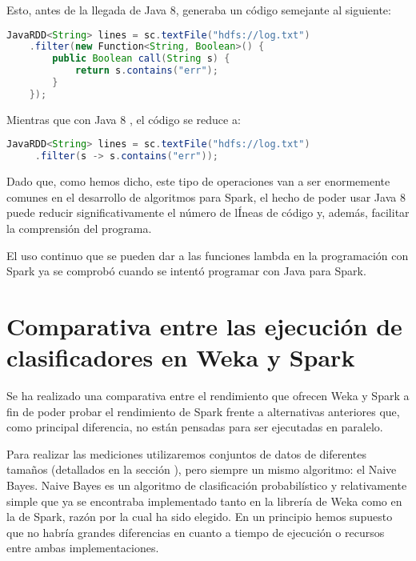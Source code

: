 Esto, antes de la llegada de Java 8, generaba un código semejante al siguiente:

\begin{lstlisting}[language=Java,tabsize=4,frame = single,caption=Código de función lambda en Java 7 \cite{Java7vs8}]
JavaRDD<String> lines = sc.textFile("hdfs://log.txt")
	.filter(new Function<String, Boolean>() {
		public Boolean call(String s) {
			return s.contains("err");
		}
	});
\end{lstlisting}

Mientras que con Java 8 , el código se reduce a:

\begin{lstlisting}[language=Java,tabsize=4,frame = single,caption=Código de función lambda en Java 8 \cite{Java7vs8}]
JavaRDD<String> lines = sc.textFile("hdfs://log.txt")
     .filter(s -> s.contains("err"));
\end{lstlisting}

Dado que, como hemos dicho, este tipo de operaciones van a ser enormemente comunes en el desarrollo de algoritmos para Spark, el hecho de poder usar Java 8 puede reducir significativamente el número de lÍneas de código y, además, facilitar la comprensión del programa.

El uso continuo que se pueden dar a las funciones lambda en la programación con Spark ya se comprobó cuando se intentó programar con Java para Spark.


\section{Comparativa entre las ejecución de clasificadores en Weka y Spark}

Se ha realizado una comparativa entre el rendimiento que ofrecen Weka y Spark a fin de poder probar el rendimiento de Spark frente a alternativas anteriores que, como principal diferencia, no están pensadas para ser ejecutadas en paralelo.

Para realizar las mediciones utilizaremos conjuntos de datos de diferentes tamaños (detallados en la sección ), pero siempre un mismo algoritmo: el Naive Bayes. Naive Bayes es un algoritmo de clasificación probabilístico y relativamente simple que ya se encontraba implementado tanto en la librería de Weka como en la de Spark, razón por la cual ha sido elegido. En un principio hemos supuesto que no habría grandes diferencias en cuanto a tiempo de ejecución o recursos entre ambas implementaciones.

